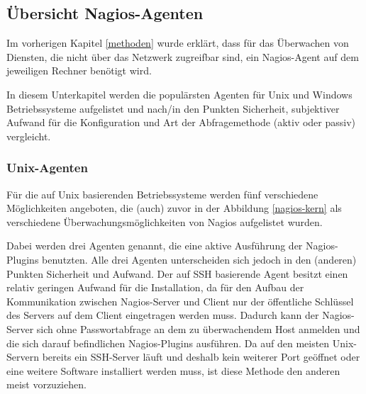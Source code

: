 \subsection{Übersicht Nagios-Agenten}
Im vorherigen Kapitel \ref{methoden} wurde erklärt, dass für das Überwachen von Diensten, die nicht über das Netzwerk zugreifbar sind, ein Nagios-Agent auf dem jeweiligen Rechner benötigt wird.

In diesem Unterkapitel werden die populärsten Agenten für Unix und Windows Betriebssysteme aufgelistet und nach/in den Punkten Sicherheit, subjektiver Aufwand für die Konfiguration und Art der Abfragemethode (aktiv oder passiv) vergleicht.

\subsubsection{Unix-Agenten}
\label{sectunixagents}
Für die auf Unix basierenden Betriebssysteme werden fünf verschiedene Möglichkeiten angeboten, die (auch) zuvor in der Abbildung \ref{nagios-kern} als verschiedene Überwachungsmöglichkeiten von Nagios aufgelistet wurden.



Dabei werden drei Agenten genannt, die eine aktive Ausführung der Nagios-Plugins benutzten.
Alle drei Agenten unterscheiden sich jedoch in den (anderen) Punkten Sicherheit und Aufwand.
Der auf \gls{SSH} basierende Agent besitzt einen relativ geringen Aufwand für die Installation, da für den Aufbau der Kommunikation zwischen Nagios-Server und Client nur der öffentliche Schlüssel des Servers auf dem Client eingetragen werden muss.
Dadurch kann der Nagios-Server sich ohne Passwortabfrage an dem zu überwachendem Host anmelden und die sich darauf befindlichen Nagios-Plugins ausführen.
Da auf den meisten Unix-Servern bereits ein \gls{SSH}-Server läuft und deshalb kein weiterer Port geöffnet oder eine weitere Software installiert werden muss, ist diese Methode den anderen meist vorzuziehen.

